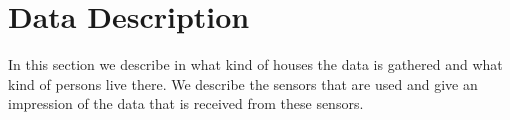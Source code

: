 \documentclass[11pt,a4paper]{article}
\begin{document}
 



\pagebreak


\section{Data Description}
\label{sec:DataDesc}
In this section we describe in what kind of houses the data is gathered and what kind of persons live there. We describe the sensors that are used and give an impression of the data that is received from these sensors.
\end{document}
